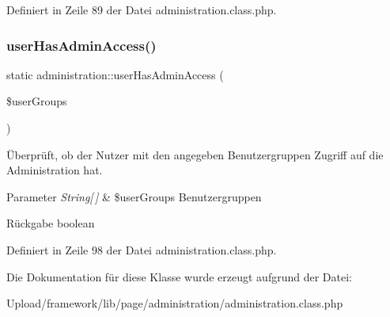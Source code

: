 Definiert in Zeile 89 der Datei administration.\+class.\+php.

\mbox{\label{classadministration_a6854e2cbbf4a76ec16895a1a1e58b12c}} 
\subsubsection{\texorpdfstring{user\+Has\+Admin\+Access()}{userHasAdminAccess()}}
{\footnotesize\ttfamily static administration\+::user\+Has\+Admin\+Access (\begin{DoxyParamCaption}\item[{}]{\$user\+Groups }\end{DoxyParamCaption})\hspace{0.3cm}{\ttfamily [static]}}

Überprüft, ob der Nutzer mit den angegeben Benutzergruppen Zugriff auf die Administration hat. 
\begin{DoxyParams}{Parameter}
{\em String\mbox{[}$\,$\mbox{]}} & \$user\+Groups Benutzergruppen \\
\hline
\end{DoxyParams}
\begin{DoxyReturn}{Rückgabe}
boolean 
\end{DoxyReturn}


Definiert in Zeile 98 der Datei administration.\+class.\+php.



Die Dokumentation für diese Klasse wurde erzeugt aufgrund der Datei\+:\begin{DoxyCompactItemize}
\item 
Upload/framework/lib/page/administration/administration.\+class.\+php\end{DoxyCompactItemize}
